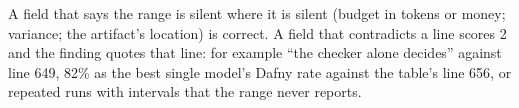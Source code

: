 \documentclass[11pt]{article}
\begin{document}
A field that says the range is silent where it is silent (budget in tokens or
money; variance; the artifact's location) is correct. A field that contradicts
a line scores 2 and the finding quotes that line: for example ``the checker
alone decides'' against line 649, 82\% as the best single model's Dafny rate
against the table's line 656, or repeated runs with intervals that the range
never reports.
\end{document}
